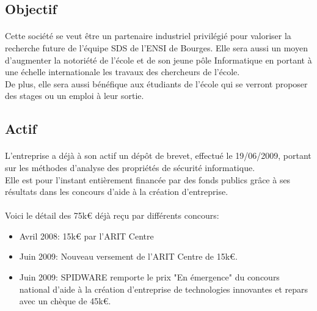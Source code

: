 		\subsection{Objectif}
			\paragraph*{}
		 		Cette société se veut être un partenaire industriel privilégié pour valoriser la recherche future de l'équipe SDS de l'ENSI de Bourges. Elle sera aussi un moyen d'augmenter la notoriété de l'école et de son jeune pôle Informatique en portant à une échelle internationale les travaux des chercheurs de l'école.\\
		 	 De plus, elle sera aussi bénéfique aux étudiants de l'école qui se verront proposer des stages ou un emploi à leur sortie.
		 	 
		\subsection{Actif}
			\paragraph*{}
				L'entreprise a déjà à son actif un dépôt de brevet, effectué le 19/06/2009, portant sur les méthodes d'analyse des propriétés de sécurité informatique.\\
		Elle est pour l'instant entièrement financée par des fonds publics grâce à ses résultats dans les concours d'aide à la création d'entreprise.
		
		\paragraph*{}
			Voici le détail des 75k\textgreek{\euro} déjà reçu par différents concours:
			\begin{itemize}
   				\item Avril 2008: 15k\textgreek{\euro} par l'ARIT Centre
   				\item Juin 2009: Nouveau versement de l'ARIT Centre de 15k\textgreek{\euro}.
   				\item Juin 2009: SPIDWARE remporte le prix "En émergence" du concours national d'aide à la création d'entreprise de technologies innovantes et repars avec un chèque de 45k\textgreek{\euro}.
   			\end{itemize}	
		
